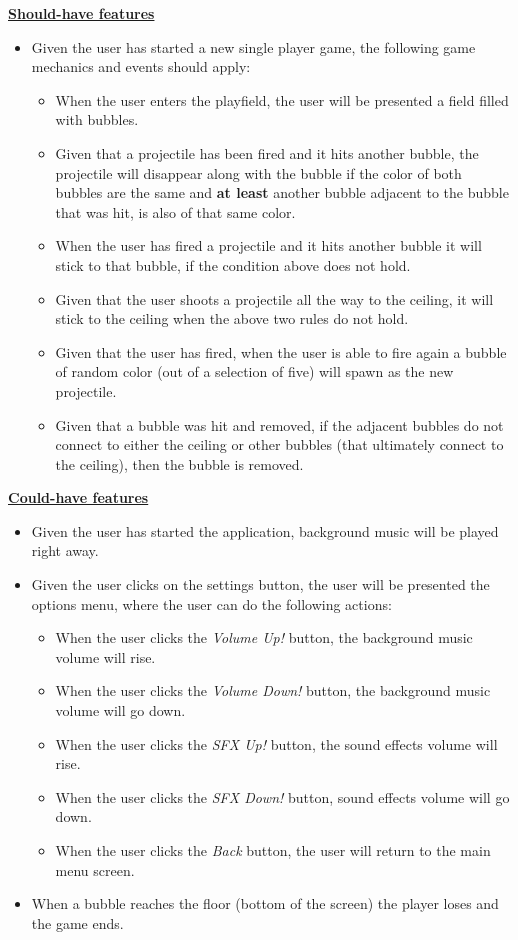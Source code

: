 \documentclass[a4paper,11pt]{article}
\begin{document}
\textbf{\underline{Should-have features}}
\begin{itemize}
\item Given the user has started a new single player game, the following game mechanics and events should apply:
  \begin{itemize}
    \item When the user enters the playfield, the user will be presented a field filled with bubbles.
    \item Given that a projectile has been fired and it hits another bubble, the projectile will disappear along with the bubble if the color of both bubbles are the same and \textbf{at least} another bubble adjacent to the bubble that was hit, is also of that same color.
    \item When the user has fired a projectile and it hits another bubble it will stick to that bubble, if the condition above does not hold.
    \item Given that the user shoots a projectile all the way to the ceiling, it will stick to the ceiling when the above two rules do not hold.
    \item Given that the user has fired, when the user is able to fire again a bubble of random color (out of a selection of five) will spawn as the new projectile.
    \item Given that a bubble was hit and removed, if the adjacent bubbles do not connect to either the ceiling or other bubbles (that ultimately connect to the ceiling), then the bubble is removed. \\
  \end{itemize}
\end{itemize}

\textbf{\underline{Could-have features}}
\begin{itemize}
  \item Given the user has started the application, background music will be played right away.
  \item Given the user clicks on the settings button, the user will be presented the options menu, where the user can do the following actions:
    \begin{itemize}
    \item When the user clicks the \textit{Volume Up!} button, the background music volume will rise.
    \item When the user clicks the \textit{Volume Down!} button, the background music volume will go down.
    \item When the user clicks the \textit{SFX Up!} button, the sound effects volume will rise.
    \item When the user clicks the \textit{SFX Down!} button, sound effects volume will go down.
    \item When the user clicks the \textit{Back} button, the user will return to the main menu screen.
    \end{itemize}
   \item When a bubble reaches the floor (bottom of the screen) the player loses and the game ends. \\
\end{itemize}
\end{document}
